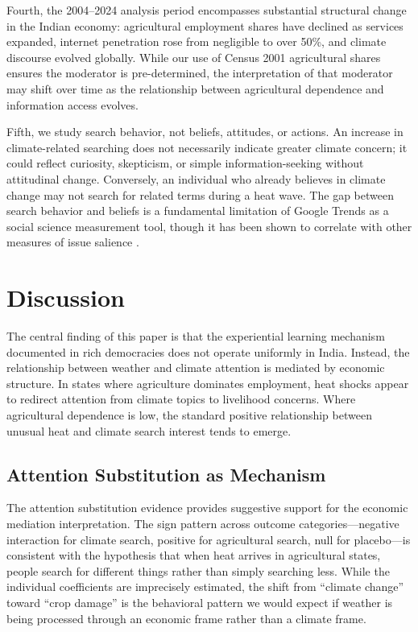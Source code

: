 \documentclass[12pt]{article}
\begin{document}
Fourth, the 2004--2024 analysis period encompasses substantial structural change in the Indian economy: agricultural employment shares have declined as services expanded, internet penetration rose from negligible to over 50\%, and climate discourse evolved globally. While our use of Census 2001 agricultural shares ensures the moderator is pre-determined, the interpretation of that moderator may shift over time as the relationship between agricultural dependence and information access evolves.

Fifth, we study search behavior, not beliefs, attitudes, or actions. An increase in climate-related searching does not necessarily indicate greater climate concern; it could reflect curiosity, skepticism, or simple information-seeking without attitudinal change. Conversely, an individual who already believes in climate change may not search for related terms during a heat wave. The gap between search behavior and beliefs is a fundamental limitation of Google Trends as a social science measurement tool, though it has been shown to correlate with other measures of issue salience \citep{stephensetal2014}.

\section{Discussion}
\label{sec:discussion}

The central finding of this paper is that the experiential learning mechanism documented in rich democracies does not operate uniformly in India. Instead, the relationship between weather and climate attention is mediated by economic structure. In states where agriculture dominates employment, heat shocks appear to redirect attention from climate topics to livelihood concerns. Where agricultural dependence is low, the standard positive relationship between unusual heat and climate search interest tends to emerge.

\subsection{Attention Substitution as Mechanism}

The attention substitution evidence provides suggestive support for the economic mediation interpretation. The sign pattern across outcome categories---negative interaction for climate search, positive for agricultural search, null for placebo---is consistent with the hypothesis that when heat arrives in agricultural states, people search for different things rather than simply searching less. While the individual coefficients are imprecisely estimated, the shift from ``climate change'' toward ``crop damage'' is the behavioral pattern we would expect if weather is being processed through an economic frame rather than a climate frame.
\end{document}
